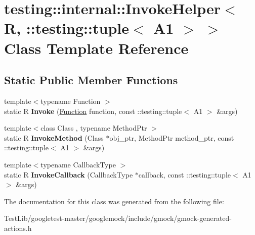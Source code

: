 \hypertarget{classtesting_1_1internal_1_1InvokeHelper_3_01R_00_01_1_1testing_1_1tuple_3_01A1_01_4_01_4}{}\section{testing\+:\+:internal\+:\+:Invoke\+Helper$<$ R, \+:\+:testing\+:\+:tuple$<$ A1 $>$ $>$ Class Template Reference}
\label{classtesting_1_1internal_1_1InvokeHelper_3_01R_00_01_1_1testing_1_1tuple_3_01A1_01_4_01_4}
\subsection*{Static Public Member Functions}
\begin{DoxyCompactItemize}
\item 
\mbox{\label{classtesting_1_1internal_1_1InvokeHelper_3_01R_00_01_1_1testing_1_1tuple_3_01A1_01_4_01_4_a162b9783d4904f5f45d4e677299cab0d}} 
{\footnotesize template$<$typename Function $>$ }\\static R {\bfseries Invoke} (\hyperlink{structtesting_1_1internal_1_1Function}{Function} function, const \+::testing\+::tuple$<$ A1 $>$ \&args)
\item 
\mbox{\label{classtesting_1_1internal_1_1InvokeHelper_3_01R_00_01_1_1testing_1_1tuple_3_01A1_01_4_01_4_a320389ba7ab6458aeb70c07a2c9e061b}} 
{\footnotesize template$<$class Class , typename Method\+Ptr $>$ }\\static R {\bfseries Invoke\+Method} (Class $\ast$obj\+\_\+ptr, Method\+Ptr method\+\_\+ptr, const \+::testing\+::tuple$<$ A1 $>$ \&args)
\item 
\mbox{\label{classtesting_1_1internal_1_1InvokeHelper_3_01R_00_01_1_1testing_1_1tuple_3_01A1_01_4_01_4_a15660d8fb6fe6ec6b2e030fed772548e}} 
{\footnotesize template$<$typename Callback\+Type $>$ }\\static R {\bfseries Invoke\+Callback} (Callback\+Type $\ast$callback, const \+::testing\+::tuple$<$ A1 $>$ \&args)
\end{DoxyCompactItemize}


The documentation for this class was generated from the following file\+:\begin{DoxyCompactItemize}
\item 
Test\+Lib/googletest-\/master/googlemock/include/gmock/gmock-\/generated-\/actions.\+h\end{DoxyCompactItemize}
